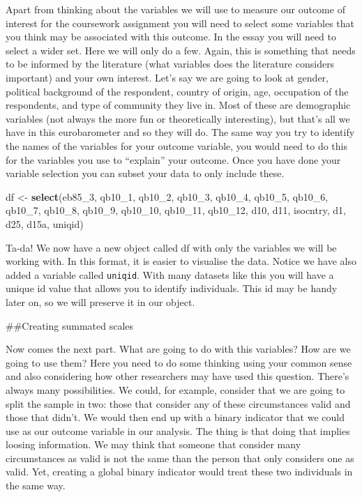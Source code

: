\documentclass[]{book}
\newenvironment{Shaded}{\begin{snugshade}}{\end{snugshade}}
\newcommand{\DecValTok}[1]{\textcolor[rgb]{0.00,0.00,0.81}{#1}}
\newcommand{\KeywordTok}[1]{\textcolor[rgb]{0.13,0.29,0.53}{\textbf{#1}}}
\newcommand{\NormalTok}[1]{#1}
\newcommand{\StringTok}[1]{\textcolor[rgb]{0.31,0.60,0.02}{#1}}
\theoremstyle{definition}
\theoremstyle{definition}
\theoremstyle{definition}
\theoremstyle{remark}
\begin{document}
Apart from thinking about the variables we will use to measure our
outcome of interest for the coursework assignment you will need to
select some variables that you think may be associated with this
outcome. In the essay you will need to select a wider set. Here we will
only do a few. Again, this is something that needs to be informed by the
literature (what variables does the literature considers important) and
your own interest. Let's say we are going to look at gender, political
background of the respondent, country of origin, age, occupation of the
respondents, and type of community they live in. Most of these are
demographic variables (not always the more fun or theoretically
interesting), but that's all we have in this eurobarometer and so they
will do. The same way you try to identify the names of the variables for
your outcome variable, you would need to do this for the variables you
use to ``explain'' your outcome. Once you have done your variable
selection you can subset your data to only include these.

\begin{Shaded}
\begin{Highlighting}[]
\NormalTok{df <-}\StringTok{ }\KeywordTok{select}\NormalTok{(eb85_}\DecValTok{3}\NormalTok{, qb10_}\DecValTok{1}\NormalTok{, qb10_}\DecValTok{2}\NormalTok{, qb10_}\DecValTok{3}\NormalTok{, qb10_}\DecValTok{4}\NormalTok{,}
\NormalTok{             qb10_}\DecValTok{5}\NormalTok{, qb10_}\DecValTok{6}\NormalTok{, qb10_}\DecValTok{7}\NormalTok{, qb10_}\DecValTok{8}\NormalTok{, qb10_}\DecValTok{9}\NormalTok{,}
\NormalTok{             qb10_}\DecValTok{10}\NormalTok{, qb10_}\DecValTok{11}\NormalTok{, qb10_}\DecValTok{12}\NormalTok{, d10, d11,}
\NormalTok{             isocntry, d1, d25, d15a, uniqid)}
\end{Highlighting}
\end{Shaded}

Ta-da! We now have a new object called df with only the variables we
will be working with. In this format, it is easier to visualise the
data. Notice we have also added a variable called \texttt{uniqid}. With
many datasets like this you will have a unique id value that allows you
to identify individuals. This id may be handy later on, so we will
preserve it in our object.

\#\#Creating summated scales

Now comes the next part. What are going to do with this variables? How
are we going to use them? Here you need to do some thinking using your
common sense and also considering how other researchers may have used
this question. There's always many possibilities. We could, for example,
consider that we are going to split the sample in two: those that
consider any of these circumstances valid and those that didn't. We
would then end up with a binary indicator that we could use as our
outcome variable in our analysis. The thing is that doing that implies
loosing information. We may think that someone that consider many
circumstances as valid is not the same than the person that only
considers one as valid. Yet, creating a global binary indicator would
treat these two individuals in the same way.
\end{document}

